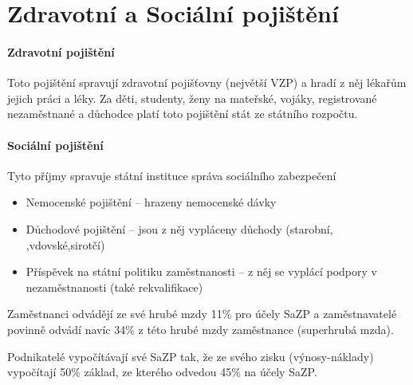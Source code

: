 \documentclass[11pt,a4paper,twoside]{book}
\begin{document}
	\section*{Zdravotní a Sociální pojištění}
	\paragraph*{Zdravotní pojištění}
	Toto pojištění spravují zdravotní pojišťovny (největší VZP) a hradí z něj lékařům jejich práci a léky. Za děti, studenty, ženy na mateřské, vojáky, registrované nezaměstnané a důchodce platí toto pojištění stát ze státního rozpočtu.

	\paragraph*{Sociální pojištění}
	Tyto příjmy spravuje státní instituce správa sociálního zabezpečení
	\begin{itemize}
		\item Nemocenské pojištění -- hrazeny nemocenské dávky
		\item Důchodové pojištění -- jsou z něj vypláceny důchody (starobní, ,vdovské,sirotčí)
		\item Příspěvek na státní politiku zaměstnanosti -- z něj se vyplácí podpory v nezaměstnanosti (také rekvalifikace)
	\end{itemize}

	Zaměstnanci odvádějí ze své hrubé mzdy 11\% pro účely SaZP a zaměstnavatelé povinně odvádí navíc 34\% z této hrubé mzdy zaměstnance (superhrubá mzda).

	Podnikatelé vypočítávají své SaZP tak, že ze svého zisku (výnosy-náklady) vypočítají 50\% základ, ze kterého odvedou 45\% na účely SaZP.
\end{document}

